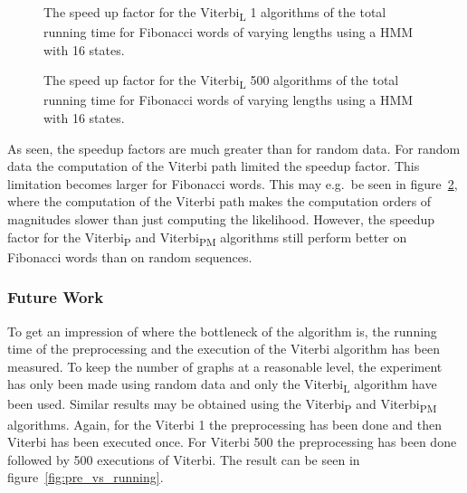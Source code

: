 \begin{figure}
  \centering
  
  \caption{The speed up factor for the Viterbi\textsubscript{L} 1 algorithms of the total
    running time for Fibonacci words of varying
    lengths using a HMM with 16 states.}
  \label{fig:fib_compressed_1_speedup_vs_sequence_length}
\end{figure}

\begin{figure}
  \centering
  
  \caption{The speed up factor for the Viterbi\textsubscript{L} 500 algorithms of the total
    running time for Fibonacci words of varying
    lengths using a HMM with 16 states.}
  \label{fig:fib_compressed_500_speedup_vs_sequence_length}
\end{figure}

As seen, the speedup factors are much greater than for random data. For random
data the computation of the Viterbi path limited the speedup factor. This
limitation becomes larger for Fibonacci words. This may e.g.\ be seen in
figure~\ref{fig:fib_compressed_500_speedup_vs_sequence_length}, where the
computation of the Viterbi path makes the computation orders of magnitudes
slower than just computing the likelihood. However, the speedup factor for the
Viterbi\textsubscript{P} and Viterbi\textsubscript{PM} algorithms still perform
better on Fibonacci words than on random sequences.

\subsubsection{Future Work}

To get an impression of where the bottleneck of the algorithm is, the running
time of the preprocessing and the execution of the Viterbi algorithm has been
measured. To keep the number of graphs at a reasonable level, the experiment
has only been made using random data and only the Viterbi\textsubscript{L}
algorithm have been used. Similar results may be obtained using the
Viterbi\textsubscript{P} and Viterbi\textsubscript{PM} algorithms. Again, for
the Viterbi 1 the preprocessing has been done and then Viterbi has been
executed once. For Viterbi 500 the preprocessing has been done followed by 500
executions of Viterbi. The result can be seen in
figure~\ref{fig:pre_vs_running}.


